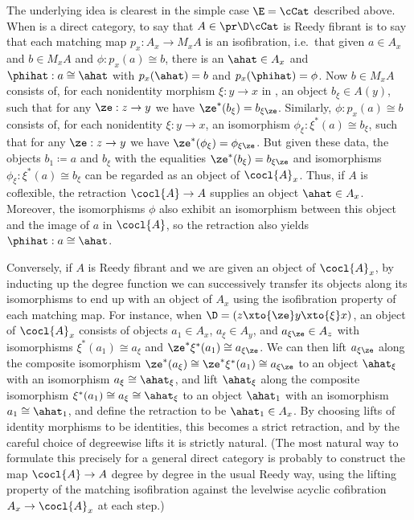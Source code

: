 \begin{verbose}
\begin{eg}
  The underlying idea is clearest in the simple case $\E=\cCat$ described above.
  When \D is a direct category, to say that $A\in \pr\D\cCat$ is Reedy fibrant is to say that each matching map $p_x:A_x\to M_x A$ is an isofibration, i.e.\ that given $a\in A_x$ and $b\in M_x A$ and $\phi : p_x(a) \cong b$, there is an $\ahat \in A_x$ and $\phihat : a\cong \ahat$ with $p_x(\ahat) = b$ and $p_x(\phihat) = \phi$.
  Now $b\in M_x A$ consists of, for each nonidentity morphism $\xi : y\to x$ in \D, an object $b_\xi \in A(y)$, such that for any $\ze : z\to y$ we have $\ze^*(b_\xi) = b_{\xi\ze}$.
  Similarly, $\phi : p_x(a) \cong b$ consists of, for each nonidentity $\xi:y\to x$, an isomorphism $\phi_\xi : \xi^*(a) \cong b_\xi$, such that for any $\ze:z\to y$ we have $\ze^*(\phi_\xi) = \phi_{\xi\ze}$.
  But given these data, the objects $b_1 \coloneqq a$ and $b_\xi$ with the equalities $\ze^*(b_\xi) = b_{\xi\ze}$ and isomorphisms $\phi_\xi : \xi^*(a) \cong b_\xi$ can be regarded as an object of $\cocl{A}_x$.
  Thus, if $A$ is coflexible, the retraction $\cocl{A} \to A$ supplies an object $\ahat \in A_x$.
  Moreover, the isomorphisms $\phi$ also exhibit an isomorphism between this object and the image of $a$ in $\cocl{A}$, so the retraction also yields $\phihat : a\cong \ahat$.

  Conversely, if $A$ is Reedy fibrant and we are given an object of $\cocl{A}_x$, by inducting up the degree function we can successively transfer its objects along its isomorphisms to end up with an object of $A_x$ using the isofibration property of each matching map.
  For instance, when $\D = (z\xto{\ze} y\xto{\xi} x)$, an object of $\cocl{A}_x$ consists of objects $a_1\in A_x$, $a_\xi \in A_y$, and $a_{\xi\ze} \in A_z$ with isomorphisms $\xi^*(a_1) \cong a_\xi$ and $\ze^*\xi^*(a_1) \cong a_{\xi\ze}$.
  We can then lift $a_{\xi\ze}$ along the composite isomorphism $\ze^*(a_\xi) \cong \ze^*\xi^*(a_1) \cong a_{\xi\ze}$ to an object $\ahat_{\xi}$ with an isomorphism $a_\xi \cong \ahat_\xi$, and lift $\ahat_\xi$ along the composite isomorphism $\xi^*(a_1) \cong a_\xi \cong \ahat_\xi$ to an object $\ahat_1$ with an isomorphism $a_1\cong \ahat_1$, and define the retraction to be $\ahat_1\in A_x$.
  By choosing lifts of identity morphisms to be identities, this becomes a strict retraction, and by the careful choice of degreewise lifts it is strictly natural.
  (The most natural way to formulate this precisely for a general direct category \D is probably to construct the map $\cocl{A} \to A$ degree by degree in the usual Reedy way, using the lifting property of the matching isofibration against the levelwise acyclic cofibration $A_x \to \cocl{A}_x$ at each step.)


\end{eg}
\end{verbose}
